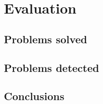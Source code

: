 \chapter{Evaluation}\label{chap:chap4}

\section*{}

\section{Problems solved}

\section{Problems detected}

\section{Conclusions}
